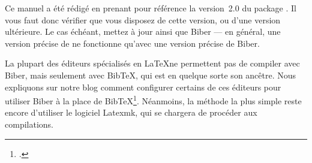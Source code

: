 \begin{attention}
Ce manuel a été rédigé en prenant pour référence la version~2.0 du package . Il vous faut donc vérifier que vous disposez de cette version, ou d'une version ultérieure. Le cas échéant, mettez à jour  ainsi que Biber --- en général, une version précise de  ne fonctionne qu'avec une version précise de Biber.
\end{attention}

\begin{attention}
La plupart des éditeurs spécialisés en \LaTeX ne permettent pas de compiler avec Biber, mais seulement avec BibTeX, qui est en quelque sorte son ancêtre. Nous expliquons sur notre blog comment configurer certains de ces éditeurs pour utiliser Biber à la place de BibTeX\footcite{biber_logiciels}. Néanmoins, la méthode la plus simple reste encore d'utiliser le logiciel Latexmk, qui se chargera de procéder aux compilations.
\end{attention}






